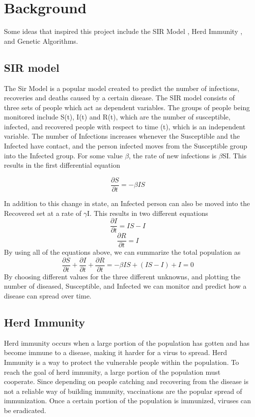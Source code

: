 \documentclass[a4paper,11pt]{article}
\begin{document}
    \section{Background}
    Some ideas that inspired this project include the SIR Model \cite{herdImm}, Herd Immunity \cite{herdImm}, and Genetic Algorithms. \cite{genetic}
    \subsection{SIR model}
    The Sir Model is a popular model created to predict the number of infections, recoveries and deaths caused by a certain disease. The SIR model consists of three sets of people which act as dependent variables. The groups of people being monitored include S(t), I(t) and R(t), which are the number of susceptible, infected, and recovered people with respect to time (t), which is an independent variable. The number of Infections increases whenever the Susceptible and the Infected have contact, and the person infected moves from the Susceptible group into the Infected group. For some value $\beta$, the rate of new infections is $\beta$SI. This results in the first differential equation

    \begin{equation}
        \frac{\partial S}{\partial t} = -\beta IS
    \end{equation}

    In addition to this change in state, an Infected person can also be moved into the Recovered set at a rate of $\gamma$I. This results in two different equations
    \begin{equation}
        \frac{\partial I}{\partial t} = IS - I
    \end{equation}
    \begin{equation}
        \frac{\partial R}{\partial t} = I
    \end{equation}
    By using all of the equations above, we can summarize the total population as
    \begin{equation}
        \frac{\partial S}{\partial t} + \frac{\partial I}{\partial t} + \frac{\partial R}{\partial t} = -\beta IS + ( IS - I) + I = 0
    \end{equation}
    By choosing different values for the three different unknowns, and plotting the number of diseased, Susceptible, and Infected we can monitor and predict how a disease can spread over time.

    \subsection{Herd Immunity}
    Herd immunity \cite{herdImm} occurs when a large portion of the population has gotten and has become immune to a disease, making it harder for a virus to spread. Herd Immunity is a way to protect the vulnerable people within the population. To reach the goal of herd immunity, a large portion of the population must cooperate. Since depending on people catching and recovering from the disease is not a reliable way of building immunity, vaccinations are the popular spread of immunization. Once a certain portion of the population is immunized, viruses can be eradicated.
\end{document}
